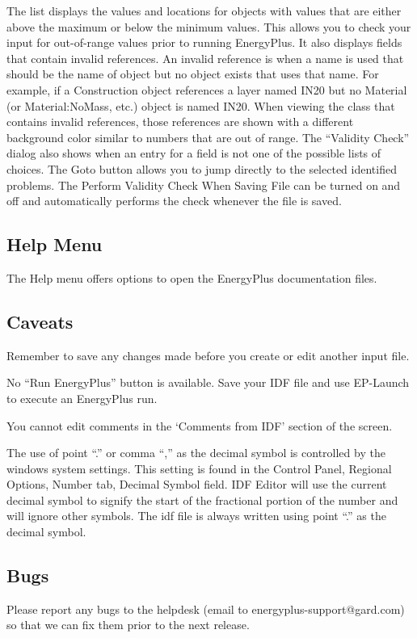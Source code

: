 The list displays the values and locations for objects with values that are either above the maximum or below the minimum values. This allows you to check your input for out-of-range values prior to running EnergyPlus. It also displays fields that contain invalid references. An invalid reference is when a name is used that should be the name of object but no object exists that uses that name. For example, if a Construction object references a layer named IN20 but no Material (or Material:NoMass, etc.) object is named IN20. When viewing the class that contains invalid references, those references are shown with a different background color similar to numbers that are out of range. The ``Validity Check'' dialog also shows when an entry for a field is not one of the possible lists of choices. The Goto button allows you to jump directly to the selected identified problems. The Perform Validity Check When Saving File can be turned on and off and automatically performs the check whenever the file is saved.

\subsection{Help Menu}\label{help-menu-000}

The Help menu offers options to open the EnergyPlus documentation files.

\subsection{Caveats}\label{caveats-000}

Remember to save any changes made before you create or edit another input file.

No ``Run EnergyPlus'' button is available. Save your IDF file and use EP-Launch to execute an EnergyPlus run.

You cannot edit comments in the `Comments from IDF' section of the screen.

The use of point ``.'' or comma ``,'' as the decimal symbol is controlled by the windows system settings. This setting is found in the Control Panel, Regional Options, Number tab, Decimal Symbol field. IDF Editor will use the current decimal symbol to signify the start of the fractional portion of the number and will ignore other symbols. The idf file is always written using point ``.'' as the decimal symbol.

\subsection{Bugs}\label{bugs-000}

Please report any bugs to the helpdesk (email to energyplus-support@gard.com) so that we can fix them prior to the next release.
